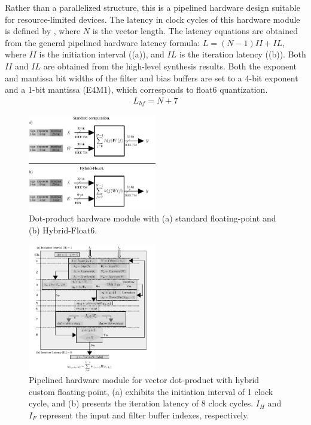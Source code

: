 Rather than a parallelized structure, this is a pipelined hardware design suitable for resource-limited devices. The latency in clock cycles of this hardware module is defined by , where $N$ is the vector length. The latency equations are obtained from the general pipelined hardware latency formula: $L=\left(N-1\right)II+IL$, where $II$ is the initiation interval ((a)), and $IL$ is the iteration latency ((b)). Both $II$ and $IL$ are obtained from the high-level synthesis results. Both the exponent and mantissa bit widths of the filter and bias buffers are set to a 4-bit exponent and a 1-bit mantissa (E4M1), which corresponds to float6 quantization.
\begin{eqnarray} \label{eq:dot_custom_float_latency}
L_{hf}=N+7
\end{eqnarray}

\begin{figure}[t!]
	\centering
	\includegraphics[width=0.5\textwidth]{../figures/dot-product_unit.pdf}
	\caption{Dot-product hardware module with (a) standard floating-point and (b) Hybrid-Float6.}
	\label{fig:dot_product}
\end{figure}

\begin{figure}[t!]
	\centering
	\includegraphics[width=0.5\textwidth]{../figures/dot_product_hybrid.pdf}
	\caption{Pipelined hardware module for vector dot-product with hybrid custom floating-point, (a) exhibits the initiation interval of 1 clock cycle, and (b) presents
		the iteration latency of 8 clock cycles. $I_H$ and $I_F$ represent the input and filter buffer indexes, respectively.}
	\label{fig:dot_product_hybrid}
\end{figure}

